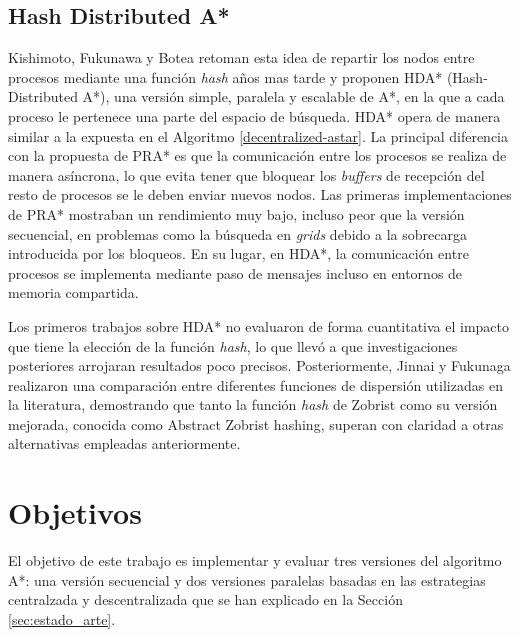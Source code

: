 \documentclass[a4paper,12pt]{article}
\begin{document}
\subsection{Hash Distributed A*}

Kishimoto, Fukunawa y Botea \cite{kishimoto2009scalable, kishimoto2013evaluation} retoman esta idea de repartir los nodos entre procesos mediante una función \textit{hash} años mas tarde y proponen HDA* (Hash-Distributed A*), una versión simple, paralela y escalable de A*, en la que a cada proceso le pertenece una parte del espacio de búsqueda. HDA* opera de manera similar a la expuesta en el Algoritmo \ref{decentralized-astar}. La principal diferencia con la propuesta de PRA* es que la comunicación entre los procesos se realiza de manera asíncrona, lo que evita tener que bloquear los \textit{buffers} de recepción del resto de procesos se le deben enviar nuevos nodos. Las primeras implementaciones de PRA* mostraban un rendimiento muy bajo, incluso peor que la versión secuencial, en problemas como la búsqueda en \textit{grids} \cite{burns2010best} debido a la sobrecarga introducida por los bloqueos. En su lugar, en HDA*, la comunicación entre procesos se implementa mediante paso de mensajes incluso en entornos de memoria compartida.

Los primeros trabajos sobre HDA* no evaluaron de forma cuantitativa el impacto que tiene la elección de la función \textit{hash}, lo que llevó a que investigaciones posteriores arrojaran resultados poco precisos. Posteriormente, Jinnai y Fukunaga \cite{jinnai2016abstract} realizaron una comparación entre diferentes funciones de dispersión utilizadas en la literatura, demostrando que tanto la función \textit{hash} de Zobrist como su versión mejorada, conocida como Abstract Zobrist hashing, superan con claridad a otras alternativas empleadas anteriormente.


\newpage
\section{Objetivos} \label{sec:objetivos}

El objetivo de este trabajo es implementar y evaluar tres versiones del algoritmo A*: una versión secuencial y dos versiones paralelas basadas en las estrategias centralzada y descentralizada que se han explicado en la Sección \ref{sec:estado_arte}.
\end{document}
